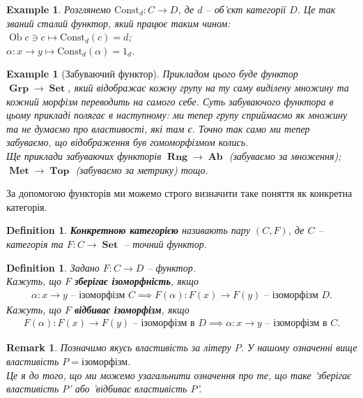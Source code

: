 \documentclass[a4paper, 10pt]{article}
\theoremstyle{theoremdd}
\newtheorem{definition}[theorem]{Definition}
\newtheorem{example}[theorem]{Example}
\newtheorem{remark}[theorem]{Remark}
\DeclareMathOperator{\Ob}{Ob}
\DeclareMathOperator{\Set}{\textbf{Set}}
\DeclareMathOperator{\Grp}{\textbf{Grp}}
\DeclareMathOperator{\Ab}{\textbf{Ab}}
\DeclareMathOperator{\Rng}{\textbf{Rng}}
\DeclareMathOperator{\Top}{\textbf{Top}}
\DeclareMathOperator{\Met}{\textbf{Met}}
\begin{document}
\begin{example}
Розглянемо $\text{Const}_d \colon C \to D$, де $d$ -- об'єкт категорії $D$. Це так званий сталий функтор, який працює таким чином:\\
$\Ob c \ni c \mapsto \text{Const}_d(c) = d$;\\
$\alpha \colon x \to y \mapsto \text{Const}_d(\alpha) = 1_d$.
\end{example}

\begin{example}[Забуваючий функтор]
Прикладом цього буде функтор $\Grp \to \Set$, який відображає кожну групу на ту саму виділену множину та кожний морфізм переводить на самого себе. Суть забуваючого функтора в цьому прикладі полягає в наступному: ми тепер групу сприймаємо як множину та не думаємо про властивості, які там є. Точно так само ми тепер забуваємо, що відображення був гомоморфізмом колись.\\
Ще приклади забуваючих функторів $\Rng \to \Ab$ (забуваємо за множення); $\Met \to \Top$ (забуваємо за метрику) тощо.
\end{example}

\noindent За допомогою функторів ми можемо строго визначити таке поняття як конкретна категорія.

\begin{definition}
\textbf{Конкретною категорією} називають пару $(C,F)$, де $C$ -- категорія та $F \colon C \to \Set$ -- точний функтор.
\end{definition}

\begin{definition}
Задано $F \colon C \to D$ -- функтор.\\
Кажуть, що $F$ \textbf{зберігає ізоморфність}, якщо
\begin{align*}
\text{$\alpha \colon x \to y$ -- ізоморфізм $C \implies F(\alpha) \colon F(x) \to F(y)$ -- ізоморфізм $D$.}
\end{align*}
Кажуть, що $F$ \textbf{відбиває ізоморфізм}, якщо
\begin{align*}
\text{$F(\alpha) \colon F(x) \to F(y)$ -- ізоморфізм в $D \implies \alpha \colon x \to y$ -- ізоморфізм в $C$.}
\end{align*}
\end{definition}

\begin{remark}
Позначимо якусь властивість за літеру $P$. У нашому означенні вище властивість $P = \text{ізоморфізм}$.\\
Це я до того, що ми можемо узагальнити означення про те, що таке 'зберігає властивість $P$' або 'відбиває властивість $P$'.
\end{remark}
\end{document}
